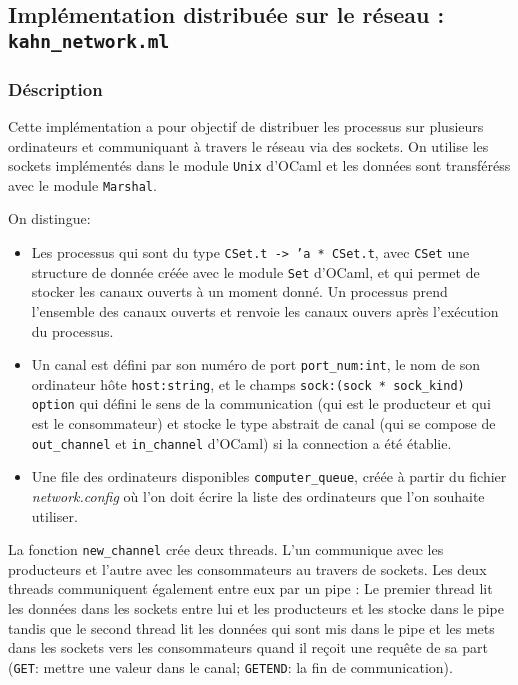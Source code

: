 \subsection{Implémentation distribuée sur le réseau :
\texttt{kahn\_network.ml}}\label{impluxe9mentation-distribuuxe9e-sur-le-ruxe9seau-kahnux5fnetwork.ml}

\subsubsection{Déscription}\label{duxe9scription}

Cette implémentation a pour objectif de distribuer les processus sur
plusieurs ordinateurs et communiquant à travers le réseau via des
sockets. On utilise les sockets implémentés dans le module \texttt{Unix}
d'OCaml et les données sont transféréss avec le module \texttt{Marshal}.

On distingue:

\begin{itemize}
\itemsep1pt\parskip0pt
\item
  Les processus qui sont du type
  \texttt{CSet.t -\textgreater{} 'a * CSet.t}, avec \texttt{CSet} une
  structure de donnée créée avec le module \texttt{Set} d'OCaml, et qui
  permet de stocker les canaux ouverts à un moment donné. Un processus
  prend l'ensemble des canaux ouverts et renvoie les canaux ouvers après
  l'exécution du processus.
\item
  Un canal est défini par son numéro de port \texttt{port\_num:int},
  le nom de son ordinateur hôte \texttt{host:string}, et le champs
  \texttt{sock:(sock *   sock\_kind) option} qui défini le sens de la
  communication (qui est le producteur et qui est le consommateur) et
  stocke le type abstrait de canal (qui se compose de
  \texttt{out\_channel} et \texttt{in\_channel} d'OCaml) si la
  connection a été établie.
\item
  Une file des ordinateurs disponibles \texttt{computer\_queue}, créée à
  partir du fichier \emph{network.config} où l'on doit écrire la liste
  des ordinateurs que l'on souhaite utiliser.
\end{itemize}

La fonction \texttt{new\_channel} crée deux threads. L'un communique
avec les producteurs et l'autre avec les consommateurs au travers de
sockets. Les deux threads communiquent également entre eux par un pipe :
Le premier thread lit les données dans les sockets entre lui et les
producteurs et les stocke dans le pipe tandis que le second thread lit
les données qui sont mis dans le pipe et les mets dans les sockets vers
les consommateurs quand il reçoit une requête de sa part (\texttt{GET}:
mettre une valeur dans le canal; \texttt{GETEND}: la fin de
communication).

